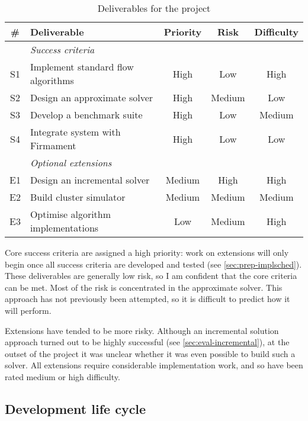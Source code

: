 \begin{table}
    \centering
    \begin{tabular}{clccc}
        \textbf{\#} & \textbf{Deliverable} & \textbf{Priority} & \textbf{Risk} & \textbf{Difficulty}
        \tabularnewline
        \hline
        & \textit{Success criteria} \tabularnewline
        S1 & Implement standard flow algorithms & High & Low & High \tabularnewline
        S2 & Design an approximate solver & High & Medium & Low \tabularnewline
        S3 & Develop a benchmark suite  & High & Low & Medium \tabularnewline
        S4 & Integrate system with Firmament & High & Low & Low \tabularnewline
        \hline
        & \textit{Optional extensions} \tabularnewline
        E1 & Design an incremental solver & Medium & High & High \tabularnewline
        E2 & Build cluster simulator & Medium & Medium & Medium \tabularnewline
        E3 & Optimise algorithm implementations & Low & Medium & High \tabularnewline
        \hline
    \end{tabular}
    \caption{Deliverables for the project}
    \label{table:prep-project-requirements}
\end{table}

Core success criteria are assigned a high priority: work on extensions will only begin once all success criteria are developed and tested (see \cref{sec:prep-implsched}). These deliverables are generally low risk, so I am confident that the core criteria can be met. Most of the risk is concentrated in the approximate solver. This approach has not previously been attempted, so it is difficult to predict how it will perform.

Extensions have tended to be more risky. Although an incremental solution approach turned out to be highly successful (see \cref{sec:eval-incremental}), at the outset of the project it was unclear whether it was even possible to build such a solver. All extensions require considerable implementation work, and so have been rated medium or high difficulty.

\subsection{Development life cycle}
\label{sec:prep-management-model}


